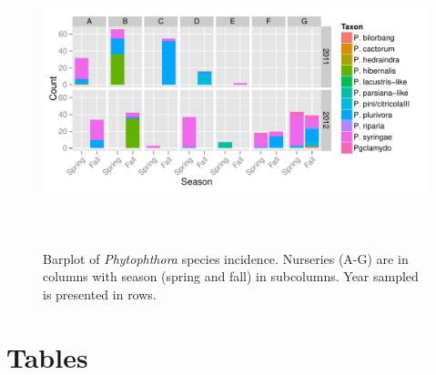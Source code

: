 \documentclass[12pt]{article}
\begin{document}
\begin{figure}[!ht]
\begin{center}
\includegraphics[width=178mm,height=85mm]{nursdiv.pdf}
\end{center}
\caption{
Barplot of \emph{Phytophthora} species incidence.  Nurseries (A-G) are in columns with season (spring and fall) in subcolumns.  Year sampled is presented in rows.
}
\label{fig:nursdiv}
\end{figure}
\clearpage


\section*{Tables}
\end{document}
